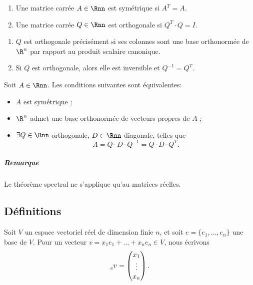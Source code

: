 \begin{mydef}\InsertTheoremBreak
	\begin{enumerate}
		\item Une matrice carrée $A \in \Rnn$ est symétrique si $A^T = A$.
		\item Une matrice carrée $Q \in \Rnn$ est orthogonale si $Q^T\cdot Q = I$.
	\end{enumerate}
\end{mydef}

\begin{myrem}\InsertTheoremBreak
	\begin{enumerate}
		\item $Q$ est orthogonale précisément si ses colonnes sont une base orthonormée de $\R^n$ par rapport au produit scalaire canonique.
		\item Si $Q$ est orthogonale, alors elle est inversible et $Q^{-1} = Q^T$.
	\end{enumerate}
\end{myrem}

\begin{mytheo}
	Soit $A \in \Rnn$.
	Les conditions suivantes sont équivalentes:
	\begin{itemize}
		\item $A$ est symétrique ;
		\item $\R^n$ admet une base orthonormée de vecteurs propres de $A$ ;
		\item $\exists Q \in \Rnn$ orthogonale, $D \in \Rnn$ diagonale, telles que
			\[ A = Q \cdot D \cdot Q^{-1} = Q \cdot D \cdot Q^T. \]
	\end{itemize}
	\subparagraph{Remarque}
	Le théorème spectral ne s'applique qu'au matrices réelles.
\end{mytheo}

\subsection{Définitions}

\begin{mynota}
	Soit $V$ un espace vectoriel réel de dimension finie $n$,
	et soit $e = \{e_1, \dots, e_n\}$ une base de $V$.
	Pour un vecteur $v = x_1e_1 + \dots + x_ne_n \in V$, nous écrivons
	\[ \tensor[_e]{v}{} = \begin{pmatrix}x_1\\\vdots\\x_n\end{pmatrix}. \]
\end{mynota}

